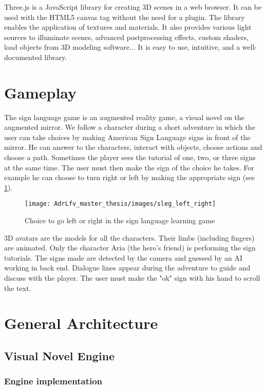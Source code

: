 Three.js is a JavaScript library for creating 3D scenes in a web browser. It can be used with the HTML5 canvas tag without the need for a plugin. The library enables the application of textures and materials. It also provides various light sources to illuminate scenes, advanced postprocessing effects, custom shaders, load objects from 3D modeling software... It is easy to use, intuitive, and a well-documented library.

\section{Gameplay}

The sign language game is an augmented reality game, a visual novel on the augmented mirror. We follow a character during a short adventure in which the user can take choices by making American Sign Language signs in front of the mirror. He can answer to the characters, interact with objects, choose actions and choose a path. 
Sometimes the player sees the tutorial of one, two, or three signs at the same time. The user must then make the sign of the choice he takes. For example he can choose to turn right or left by making the appropriate sign (see \ref{fig:sleg_left_right}). 

\begin{figure}[h]
    \centering
    \texttt{[image: AdrLfv\_master\_thesis/images/sleg\_left\_right]}
    \caption{Choice to go left or right in the sign language learning game}
    \label{fig:sleg_left_right}
\end{figure}

3D avatars are the models for all the characters. Their limbs (including fingers) are animated. Only the character Aria (the hero's friend) is performing the sign tutorials.
The signs made are detected by the camera and guessed by an AI working in back end. Dialogue lines appear during the adventure to guide and discuss with the player. The user must make the "ok" sign with his hand to scroll the text.


\section{General Architecture}

\subsection{Visual Novel Engine}

\subsubsection{Engine implementation}

